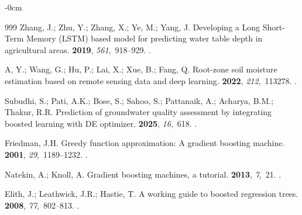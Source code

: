 \documentclass[land,review,accept,pdftex,oneauthor]{Definitions/mdpi}
\begin{document}
\begin{adjustwidth}{-\extralength}{0cm}
\begin{thebibliography}{999}
Zhang, J.; Zhu, Y.; Zhang, X.; Ye, M.; Yang, J.
\newblock Developing a Long Short-Term Memory (LSTM) based model for predicting
  water table depth in agricultural areas.
 {\bf 2019}, {\em 561},~918--929.
.

A, Y.; Wang, G.; Hu, P.; Lai, X.; Xue, B.; Fang, Q.
\newblock Root-zone soil moisture estimation based on remote sensing data and
  deep learning.
 {\bf 2022}, {\em 212},~113278.
.

Subudhi, S.; Pati, A.K.; Bose, S.; Sahoo, S.; Pattanaik, A.; Acharya, B.M.;
  Thakur, R.R.
\newblock Prediction of groundwater quality assessment by integrating boosted
  learning with DE optimizer.
 {\bf 2025}, {\em 16},~618.
.

Friedman, J.H.
\newblock  Greedy function approximation: A gradient boosting machine. %
 {\bf 2001}, {\em 29},~1189--1232.
.

Natekin, A.; Knoll, A.
\newblock Gradient boosting machines, a tutorial.
 {\bf 2013}, {\em 7},~21.
.

Elith, J.; Leathwick, J.R.; Hastie, T.
\newblock A working guide to boosted regression trees.
 {\bf 2008}, {\em 77},~802--813.
.


\end{thebibliography}
\end{adjustwidth}
\end{document}
